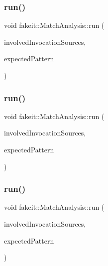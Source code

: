 \subsubsection{\texorpdfstring{run()}{run()}\hspace{0.1cm}{\footnotesize\ttfamily [1/9]}}
{\footnotesize\ttfamily void fakeit\+::\+Match\+Analysis\+::run (\begin{DoxyParamCaption}\item[{\mbox{\hyperlink{structfakeit_1_1InvocationsSourceProxy}{Invocations\+Source\+Proxy}} \&}]{involved\+Invocation\+Sources,  }\item[{std\+::vector$<$ \mbox{\hyperlink{classfakeit_1_1Sequence}{Sequence}} $\ast$ $>$ \&}]{expected\+Pattern }\end{DoxyParamCaption})\hspace{0.3cm}{\ttfamily [inline]}}

\mbox{\label{structfakeit_1_1MatchAnalysis_a6c064d01a4c375d30898208326ee3189}} 
\subsubsection{\texorpdfstring{run()}{run()}\hspace{0.1cm}{\footnotesize\ttfamily [2/9]}}
{\footnotesize\ttfamily void fakeit\+::\+Match\+Analysis\+::run (\begin{DoxyParamCaption}\item[{\mbox{\hyperlink{structfakeit_1_1InvocationsSourceProxy}{Invocations\+Source\+Proxy}} \&}]{involved\+Invocation\+Sources,  }\item[{std\+::vector$<$ \mbox{\hyperlink{classfakeit_1_1Sequence}{Sequence}} $\ast$ $>$ \&}]{expected\+Pattern }\end{DoxyParamCaption})\hspace{0.3cm}{\ttfamily [inline]}}

\mbox{\label{structfakeit_1_1MatchAnalysis_a6c064d01a4c375d30898208326ee3189}} 
\subsubsection{\texorpdfstring{run()}{run()}\hspace{0.1cm}{\footnotesize\ttfamily [3/9]}}
{\footnotesize\ttfamily void fakeit\+::\+Match\+Analysis\+::run (\begin{DoxyParamCaption}\item[{\mbox{\hyperlink{structfakeit_1_1InvocationsSourceProxy}{Invocations\+Source\+Proxy}} \&}]{involved\+Invocation\+Sources,  }\item[{std\+::vector$<$ \mbox{\hyperlink{classfakeit_1_1Sequence}{Sequence}} $\ast$ $>$ \&}]{expected\+Pattern }\end{DoxyParamCaption})\hspace{0.3cm}{\ttfamily [inline]}}

